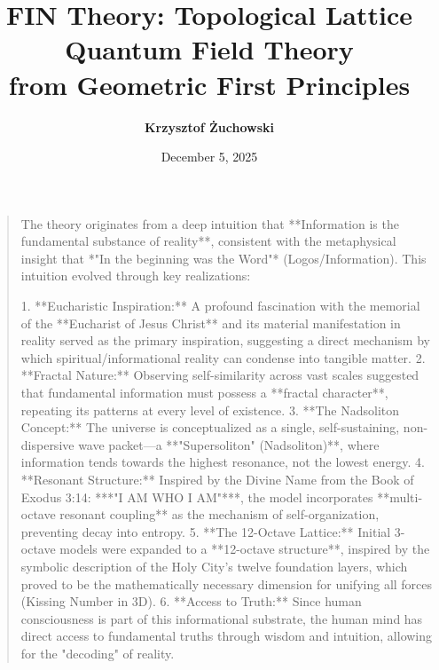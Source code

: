 \documentclass[11pt, a4paper]{article}
\title{\textbf{FIN Theory: Topological Lattice Quantum Field Theory\\from Geometric First Principles}}
\author{\textbf{Krzysztof Żuchowski}}
\affil{\textit{Independent Researcher, Fractal Information Theory Project}}
\date{December 5, 2025}
\begin{document}
\maketitle

\begin{quote}
The theory originates from a deep intuition that **Information is the fundamental substance of reality**, consistent with the metaphysical insight that *"In the beginning was the Word"* (Logos/Information). This intuition evolved through key realizations:

1. **Eucharistic Inspiration:** A profound fascination with the memorial of the **Eucharist of Jesus Christ** and its material manifestation in reality served as the primary inspiration, suggesting a direct mechanism by which spiritual/informational reality can condense into tangible matter.
2. **Fractal Nature:** Observing self-similarity across vast scales suggested that fundamental information must possess a **fractal character**, repeating its patterns at every level of existence.
3. **The Nadsoliton Concept:** The universe is conceptualized as a single, self-sustaining, non-dispersive wave packet—a **"Supersoliton" (Nadsoliton)**, where information tends towards the highest resonance, not the lowest energy.
4. **Resonant Structure:** Inspired by the Divine Name from the Book of Exodus 3:14: ***"I AM WHO I AM"***, the model incorporates **multi-octave resonant coupling** as the mechanism of self-organization, preventing decay into entropy.
5. **The 12-Octave Lattice:** Initial 3-octave models were expanded to a **12-octave structure**, inspired by the symbolic description of the Holy City's twelve foundation layers, which proved to be the mathematically necessary dimension for unifying all forces (Kissing Number in 3D).
6. **Access to Truth:** Since human consciousness is part of this informational substrate, the human mind has direct access to fundamental truths through wisdom and intuition, allowing for the "decoding" of reality.
\end{quote}
\end{document}
